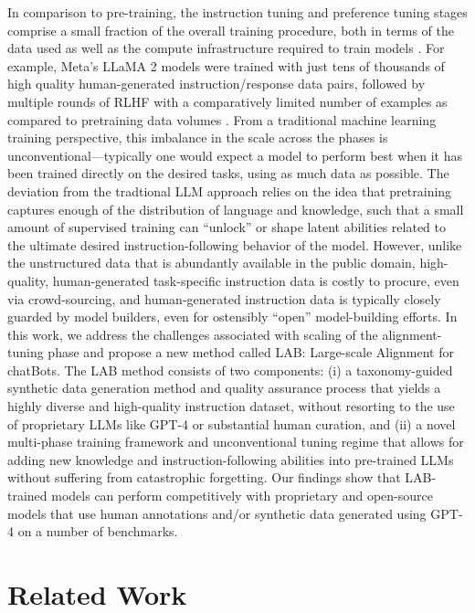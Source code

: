 In comparison to pre-training, the instruction tuning and preference tuning stages comprise a small fraction of the overall training procedure, both in terms of the data used as well as the compute infrastructure required to train models \cite{touvron2023llama}. For example, Meta's LLaMA 2 models were trained with just tens of thousands of high quality human-generated instruction/response data pairs, followed by multiple rounds of RLHF with a comparatively limited number of examples as compared to pretraining data volumes \cite{touvron2023llama}. From a traditional machine learning training perspective, this imbalance in the scale across the phases is unconventional---typically one would expect a model to perform best when it has been trained directly on the desired tasks, using as much data as possible. The deviation from the tradtional LLM approach relies on the idea that pretraining captures enough of the distribution of language and knowledge, such that a small amount of supervised training can ``unlock'' or shape latent abilities related to the ultimate desired instruction-following behavior of the model. However, unlike the unstructured data that is abundantly available in the public domain, high-quality, human-generated task-specific instruction data is costly to procure, even via crowd-sourcing, and human-generated instruction data is typically closely guarded by model builders, even for ostensibly ``open'' model-building efforts.
In this work, we address the challenges associated with scaling of the alignment-tuning phase and propose a new method called LAB: Large-scale Alignment for chatBots. %
The LAB method consists of two components: (i) a taxonomy-guided synthetic data generation method and quality assurance process that yields a highly diverse and high-quality instruction dataset, without resorting to the use of proprietary LLMs like GPT-4 or substantial human curation, and (ii) a novel multi-phase training framework and unconventional tuning regime that allows for adding new knowledge and instruction-following abilities into pre-trained LLMs without suffering from catastrophic forgetting. Our findings show that LAB-trained models can perform competitively with proprietary and open-source models that use human annotations and/or synthetic data generated using GPT-4 on a number of benchmarks. 

\section{Related Work}

